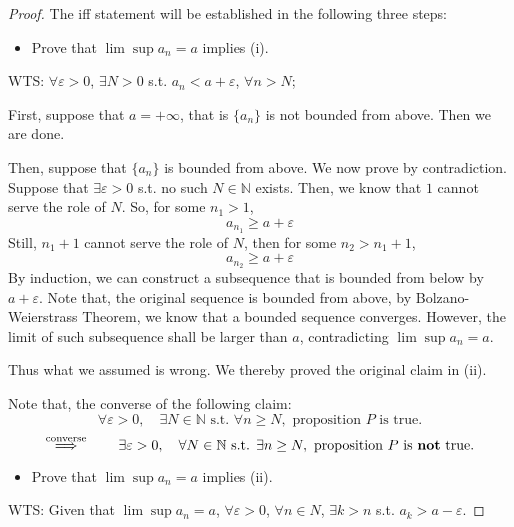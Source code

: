 \documentclass[12pt]{article}
\newcommand{\N}{{\mathbb N}}
\theoremstyle{definition}
\theoremstyle{plain}
\begin{document}
\begin{proof} The iff statement will be established in the following three steps:
    \begin{itemize}
        \item Prove that $\lim\sup a_n = a$ implies (i).
    \end{itemize}
    WTS: $\forall \varepsilon > 0$, $\exists N > 0$ s.t. $a_n < a +
        \varepsilon$, $\forall n > N$;

        First, suppose that $a = +\infty$, that is $\{a_n\}$ is not bounded from
        above. Then we are done.

        Then, suppose that $\{a_n\}$ is bounded from above. We now prove by
        contradiction. Suppose that $\exists \varepsilon > 0$ s.t. no such $N
        \in \N$ exists. Then, we know that $1$ cannot serve the role of $N$.
        So, for some $n_1 > 1$,
        \[
            a_{n_1} \ge a + \varepsilon
        \]
        Still, $n_1 + 1$ cannot serve the role of $N$, then for some $n_2 > n_1
        + 1$,
        $$a_{n_2} \ge a + \varepsilon$$
        By induction, we can construct a subsequence that is bounded from below by
        $a + \varepsilon$. Note that, the original sequence is bounded from
        above, by Bolzano-Weierstrass Theorem, we know that a bounded sequence
        converges. However, the limit of such subsequence shall be larger than $a$,
        contradicting $\lim\sup a_n = a$.

        Thus what we assumed is wrong. We thereby proved the original claim in
        (ii).
    \begin{mdframed}
        Note that, the converse of the following claim:
        \[
            \forall \varepsilon > 0, \quad \exists N \in \N \text{ s.t. }
            \forall n \ge N, \text{ proposition } P \text{ is true.}
        \]
        \[
            \overset{\text{converse}} \implies \qquad
            \exists \varepsilon > 0, \quad \forall N \in \N \text{ s.t. }
            \exists n \ge N, \text{ proposition } P \text{ is \textbf{not} true.}
        \]
    \end{mdframed}


    \begin{itemize}
        \item Prove that $\lim\sup a_n = a$ implies (ii).
    \end{itemize}
    WTS: Given that $\lim\sup a_n = a$,
    $\forall \varepsilon > 0$, $\forall n \in N$, $\exists k > n$ s.t.
        $a_k > a - \varepsilon$.


\end{proof}
\end{document}
